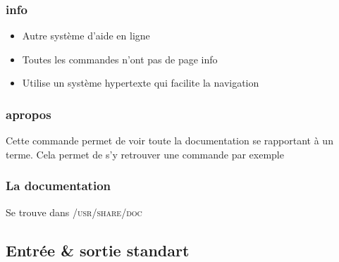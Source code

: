 \documentclass[a4paper]{article}
\begin{document}
    \subsubsection{info}
    \begin{itemize}[label=\textbullet, font=\Large]
      \item Autre système d'aide en ligne
      \item Toutes les commandes n'ont pas de page info
      \item Utilise un système hypertexte qui facilite la navigation
    \end{itemize}

    \subsubsection{apropos}
    Cette commande permet de voir toute la documentation se rapportant à un terme. Cela permet de s’y
retrouver une commande par exemple
    \subsubsection{La documentation}
    Se trouve dans \textsc{/usr/share/doc}

    \subsection{Entrée \& sortie standart}
\end{document}
